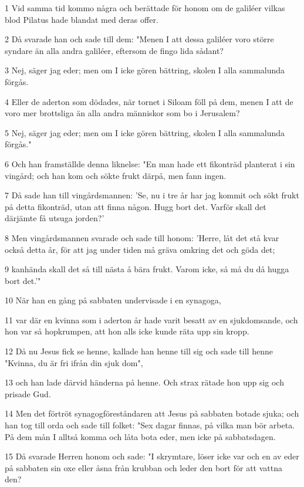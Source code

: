 \par 1 Vid samma tid kommo några och berättade för honom om de galiléer vilkas blod Pilatus hade blandat med deras offer.
\par 2 Då svarade han och sade till dem: "Menen I att dessa galiléer voro större syndare än alla andra galiléer, eftersom de fingo lida sådant?
\par 3 Nej, säger jag eder; men om I icke gören bättring, skolen I alla sammalunda förgås.
\par 4 Eller de aderton som dödades, när tornet i Siloam föll på dem, menen I att de voro mer brottsliga än alla andra människor som bo i Jerusalem?
\par 5 Nej, säger jag eder; men om I icke gören bättring, skolen I alla sammalunda förgås."
\par 6 Och han framställde denna liknelse: "En man hade ett fikonträd planterat i sin vingård; och han kom och sökte frukt därpå, men fann ingen.
\par 7 Då sade han till vingårdsmannen: 'Se, nu i tre år har jag kommit och sökt frukt på detta fikonträd, utan att finna någon. Hugg bort det. Varför skall det därjämte få utsuga jorden?'
\par 8 Men vingårdsmannen svarade och sade till honom: 'Herre, låt det stå kvar också detta år, för att jag under tiden må gräva omkring det och göda det;
\par 9 kanhända skall det så till nästa å bära frukt. Varom icke, så må du då hugga bort det.'"
\par 10 När han en gång på sabbaten undervisade i en synagoga,
\par 11 var där en kvinna som i aderton år hade varit besatt av en sjukdomsande, och hon var så hopkrumpen, att hon alls icke kunde räta upp sin kropp.
\par 12 Då nu Jesus fick se henne, kallade han henne till sig och sade till henne "Kvinna, du är fri ifrån din sjuk dom",
\par 13 och han lade därvid händerna på henne. Och strax rätade hon upp sig och prisade Gud.
\par 14 Men det förtröt synagogföreståndaren att Jesus på sabbaten botade sjuka; och han tog till orda och sade till folket: "Sex dagar finnas, på vilka man bör arbeta. På dem mån I alltså komma och låta bota eder, men icke på sabbatsdagen.
\par 15 Då svarade Herren honom och sade: "I skrymtare, löser icke var och en av eder på sabbaten sin oxe eller åsna från krubban och leder den bort för att vattna den?
